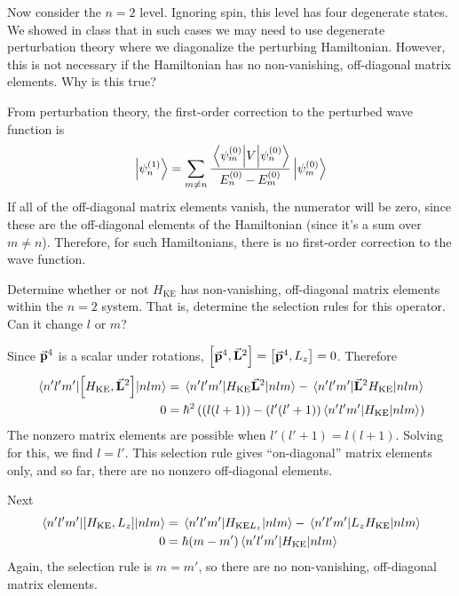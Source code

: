 \documentclass[a4paper,twoside]{article}
\begin{document}
Now consider the $ n = 2 $ level. Ignoring spin, this level has four degenerate states. We showed in class that in such cases we may need to use degenerate perturbation theory where we diagonalize the perturbing Hamiltonian. However, this is not necessary if the Hamiltonian has no non-vanishing, off-diagonal matrix elements. Why is this true?

\begin{problem}
    From perturbation theory, the first-order correction to the perturbed wave function is
    \begin{equation}
        \ket{\psi_n^{(1)}} = \sum_{m \neq n} \frac{\mel{\psi_m^{(0)}}{V}{\psi_n^{(0)}}}{E_n^{(0)} - E_m^{(0)}}\ket{\psi_m^{(0)}}
    \end{equation}
    If all of the off-diagonal matrix elements vanish, the numerator will be zero, since these are the off-diagonal elements of the Hamiltonian (since it's a sum over $ m \neq n $). Therefore, for such Hamiltonians, there is no first-order correction to the wave function.
\end{problem}

Determine whether or not $ H_{\text{KE}} $ has non-vanishing, off-diagonal matrix elements within the $ n = 2 $ system. That is, determine the selection rules for this operator. Can it change $ l $ or $ m $?

\begin{problem}
    Since $ \va{p}^4 $ is a scalar under rotations, $ \comm{\va{p}^4}{\va{L}^2} = \comm{\va{p}^4}{L_z} = 0 $. Therefore
    \begin{align}
        \mel{n'l'm'}{\comm{H_{\text{KE}}}{\va{L}^2}}{nlm} &= \mel{n'l'm'}{H_{\text{KE}} \va{L}^2}{nlm} - \mel{n'l'm'}{\va{L}^2 H_{\text{KE}}}{nlm} \\
        0 &= \hbar^2 \left( (l(l+1)) - (l'(l'+1)) \mel{n'l'm'}{H_{\text{KE}}}{nlm} \right)
    \end{align}
    The nonzero matrix elements are possible when $ l'(l'+1) = l(l+1) $. Solving for this, we find $ l = l' $. This selection rule gives ``on-diagonal'' matrix elements only, and so far, there are no nonzero off-diagonal elements.

    Next
    \begin{align}
        \mel{n'l'm'}{\comm{H_{\text{KE}}}{L_z}}{nlm} &= \mel{n'l'm'}{H_{\text{KE} L_z}}{nlm} - \mel{n'l'm'}{L_z H_{\text{KE}}}{nlm} \\
        0 &= \hbar (m - m') \mel{n'l'm'}{H_{\text{KE}}}{nlm}
    \end{align}
    Again, the selection rule is $ m = m' $, so there are no non-vanishing, off-diagonal matrix elements.
\end{problem}
\end{document}
